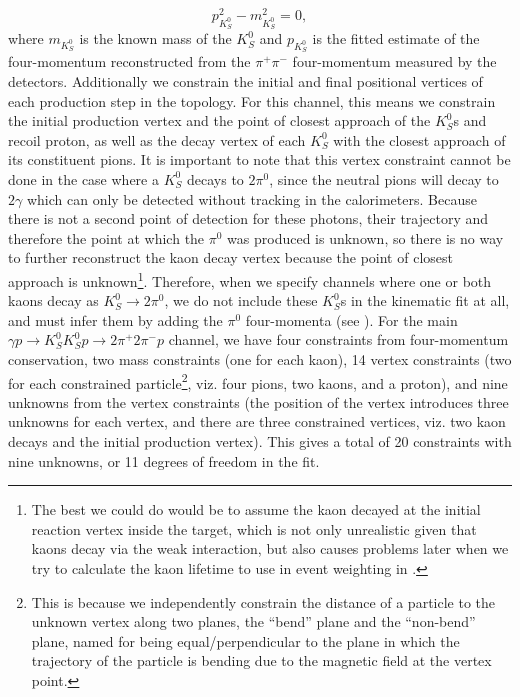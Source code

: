 \begin{equation}
  p_{K_S^0}^2 - m_{K_S^0}^2 = 0,
\end{equation}
where $m_{K_S^0}$ is the known mass of the $K_S^0$ and $p_{K_S^0}$ is the fitted estimate of the four-momentum reconstructed from the $\pi^+\pi^-$ four-momentum measured by the detectors. Additionally we constrain the initial and final positional vertices of each production step in the topology. For this channel, this means we constrain the initial production vertex and the point of closest approach of the $K_S^0$s and recoil proton, as well as the decay vertex of each $K_S^0$ with the closest approach of its constituent pions. It is important to note that this vertex constraint cannot be done in the case where a $K_S^0$ decays to $2\pi^0$, since the neutral pions will decay to $2\gamma$ which can only be detected without tracking in the calorimeters. Because there is not a second point of detection for these photons, their trajectory and therefore the point at which the $\pi^0$ was produced is unknown, so there is no way to further reconstruct the kaon decay vertex because the point of closest approach is unknown\footnote{The best we could do would be to assume the kaon decayed at the initial reaction vertex inside the target, which is not only unrealistic given that kaons decay via the weak interaction, but also causes problems later when we try to calculate the kaon lifetime to use in event weighting in .}. Therefore, when we specify channels where one or both kaons decay as $K_S^0\to 2\pi^0$, we do not include these $K_S^0$s in the kinematic fit at all, and must infer them by adding the $\pi^0$ four-momenta (see ). For the main $\gamma p \to K_S^0K_S^0p \to 2\pi^+2\pi^-p$ channel, we have four constraints from four-momentum conservation, two mass constraints (one for each kaon), 14 vertex constraints (two for each constrained particle\footnote{This is because we independently constrain the distance of a particle to the unknown vertex along two planes, the ``bend'' plane and the ``non-bend'' plane, named for being equal/perpendicular to the plane in which the trajectory of the particle is bending due to the magnetic field at the vertex point.}, viz. four pions, two kaons, and a proton), and nine unknowns from the vertex constraints (the position of the vertex introduces three unknowns for each vertex, and there are three constrained vertices, viz. two kaon decays and the initial production vertex). This gives a total of 20 constraints with nine unknowns, or 11 degrees of freedom in the fit.

